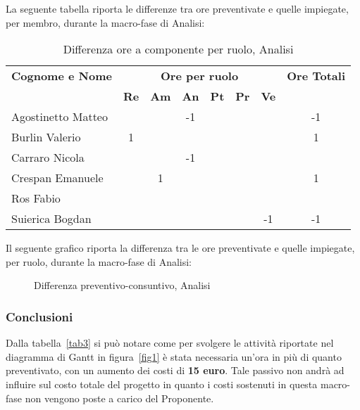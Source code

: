 \noindent La seguente tabella riporta le differenze tra ore preventivate e quelle impiegate, per membro, durante la macro-fase di Analisi: 
\begin{table}[h]
\centering
\begin{tabular}{|l|c|c|c|c|c|c|c|}
	\toprule
	\textbf{Cognome e Nome} & \multicolumn{6}{c}{\textbf{Ore per ruolo}} & \textbf{Ore Totali} \\
	& \textbf{Re} & \textbf{Am} & \textbf{An} & \textbf{Pt} & \textbf{Pr} & \textbf{Ve} & \\
		
	\midrule
	Agostinetto Matteo & & & -1 & & & & -1 \\
	Burlin Valerio & 1 & & & & & & 1 \\ 
	Carraro Nicola & & & -1 & & & & \\
	Crespan Emanuele & & 1 & & & & & 1 \\
	Ros Fabio & & & & & & & \\
	Suierica Bogdan & & & & & & -1 & -1 \\
		
	\bottomrule
\end{tabular}
\caption{Differenza ore a componente per ruolo, Analisi}
\end{table}

\newpage
\noindent Il seguente grafico riporta la differenza tra le ore preventivate e quelle impiegate, per ruolo, durante la macro-fase di Analisi:
\begin{figure}[h]
\centering
{}
\caption{Differenza preventivo-consuntivo, Analisi}
\end{figure}

\subsubsection{Conclusioni}
Dalla tabella~\ref{tab3} si può notare come per svolgere le attività riportate nel diagramma di \gls{Gantt} in figura~\ref{fig1} è stata necessaria un'ora in più di quanto preventivato, con un aumento dei costi di \textbf{15 euro}. Tale passivo non andrà ad influire sul costo totale del progetto in quanto i costi sostenuti in questa macro-fase non vengono poste a carico del Proponente.  

